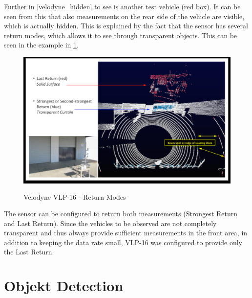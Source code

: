 \documentclass[11pt,oneside,openright]{mpreport}
\begin{document}
Further in \cref{velodyne_hidden} to see is another test vehicle (red box). It can be seen from this that also measurements on the rear side of the vehicle are visible, 
which is actually hidden. This is explained by the fact that the sensor has several return modes, which allows it to see through transparent objects. 
This can be seen in the example in \cref{vel_trans}.

\begin{figure}[!ht]
\caption{Velodyne VLP-16 - Return Modes \cite{manVEL}}
\includegraphics[width=\textwidth]{bilder/velodyne_trans.png}
\label{vel_trans}
\end{figure}


The sensor can be configured to return both measurements (Strongest Return and Last Return). Since the vehicles to be observed are not completely transparent and thus 
always provide sufficient measurements in the front area, in addition to keeping the data rate small, VLP-16 was configured to provide only the Last Return.



\chapter{Objekt Detection}
\end{document}
